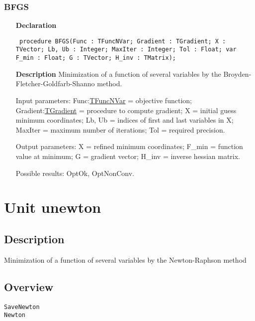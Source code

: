 \documentclass[12pt,a4paper,oneside]{report}
\newcommand{\declarationitem}[1]{\textbf{#1}}
\newcommand{\descriptiontitle}[1]{\textbf{#1}}
\newcommand{\code}[1]{\texttt{#1}}
\begin{document}
\subsubsection{BFGS}
\label{ubfgs-BFGS}
\begin{itemize}\item[\declarationitem{Declaration}\hfill]
	\begin{flushleft}
		\code{
			procedure BFGS(Func : TFuncNVar; Gradient : TGradient; X : TVector; Lb, Ub : Integer; MaxIter : Integer; Tol : Float; var F{\_}min : Float; G : TVector; H{\_}inv : TMatrix);}
		
	\end{flushleft}
	
	\par
	\item[\descriptiontitle{Description}]
	Minimization of a function of several variables by the Broyden{-}Fletcher{-}Goldfarb{-}Shanno method.
	
	Input parameters: Func:\hyperref[utypes-TFuncNVar]{TFuncNVar} = objective function; Gradient:\hyperref[utypes-TGradient]{TGradient} = procedure to compute gradient; X = initial guess minimum coordinates; Lb, Ub = indices of first and last variables in X; MaxIter = maximum number of iterations; Tol = required precision.
	
	Output parameters: X = refined minimum coordinates; F{\_}min = function value at minimum; G = gradient vector; H{\_}inv = inverse hessian matrix.
	
	Possible results: OptOk, OptNonConv.
	
\end{itemize}


\section{Unit unewton}
\label{unewton}
\subsection{Description}
Minimization of a function of several variables by the Newton{-}Raphson method 
\subsection{Overview}
\begin{description}
	\item[\texttt{SaveNewton}]
	\item[\texttt{Newton}]
\end{description}
\end{document}
